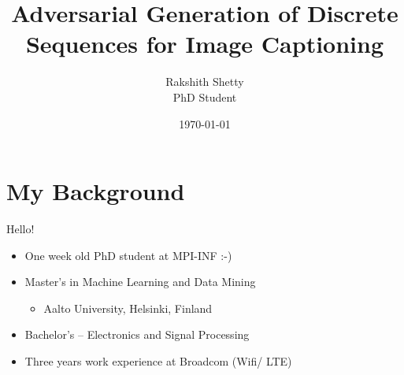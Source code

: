 \documentclass{beamer}
\begin{document}

\title{Adversarial Generation of Discrete Sequences for Image Captioning}
\author[Rakshith Shetty]{Rakshith Shetty\\[4mm] {\small PhD Student}}
\date{\today}

\frame{\titlepage} 

\section{My Background}

\begin{frame}{Hello!}
  \begin{itemize}
    \item One week old PhD student at MPI-INF :-)
    \item Master's in Machine Learning and Data Mining 
        \begin{itemize}
            \item Aalto University, Helsinki, Finland
        \end{itemize}
    \item Bachelor's -- Electronics and Signal Processing 
    \item Three years work experience at Broadcom (Wifi/ LTE)
  \end{itemize}
\end{frame}
\end{document}
